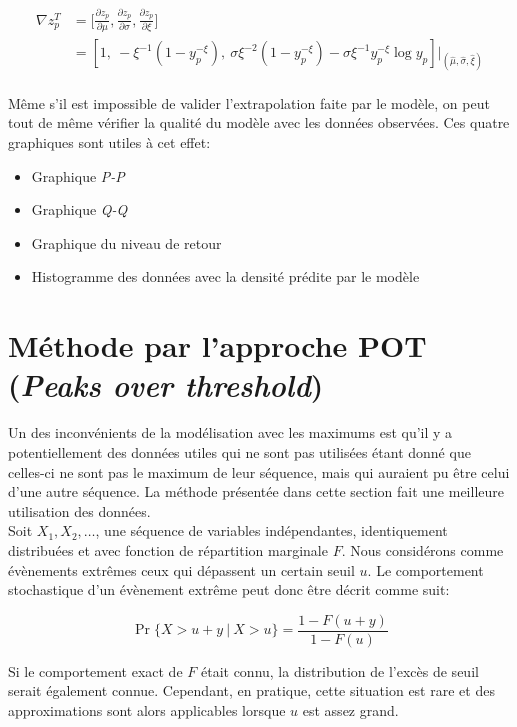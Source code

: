 \begin{equation}\label{eq:1.1.10}
\begin{split}
\nabla z_p^T &= \Big[ \frac{\partial z_p}{\partial \mu}, \frac{\partial z_p}{\partial \sigma}, \frac{\partial z_p}{\partial \xi}\Big] \\
&= [1,\ -\xi^{-1}(1-y_p^{-\xi}),\ \sigma\xi^{-2}(1-y_p^{-\xi}) - \sigma\xi^{-1}y_p^{-\xi}\log y_p]\Bigg|_{(\hat\mu, \hat\sigma, \hat\xi)}
\end{split}
\end{equation}
\\

Même s'il est impossible de valider l'extrapolation faite par le modèle, on peut tout de même vérifier la qualité du modèle avec les données observées. Ces quatre graphiques sont utiles à cet effet:
\begin{itemize}
\item Graphique \textit{P-P}
\item Graphique \textit{Q-Q}
\item Graphique du niveau de retour
\item Histogramme des données avec la densité prédite par le modèle 
\end{itemize}


\section{Méthode par l'approche POT (\textit{Peaks over threshold})}
\label{sec:pot} 

Un des inconvénients de la modélisation avec les maximums est qu'il y a potentiellement des données utiles qui ne sont pas utilisées étant donné que celles-ci ne sont pas le maximum de leur séquence, mais qui auraient pu être celui d'une autre séquence. La méthode présentée dans cette section fait une meilleure utilisation des données.\\

Soit $X_1, X_2,\dots$, une séquence de variables indépendantes, identiquement distribuées et avec fonction de répartition marginale $F$. Nous considérons comme évènements extrêmes ceux qui dépassent un certain seuil $u$. Le comportement stochastique d'un évènement extrême peut donc être décrit comme suit:

\begin{equation}\label{eq:1.2.1}
{\Pr{\{ X>u+y\ |\ X>u \}} = \frac{1-F(u+y)}{1- F(u)}}
\end{equation}

Si le comportement exact de $F$ était connu, la distribution de l'excès de seuil serait également connue. Cependant, en pratique, cette situation est rare et des approximations sont alors applicables lorsque $u$ est assez grand. \\

